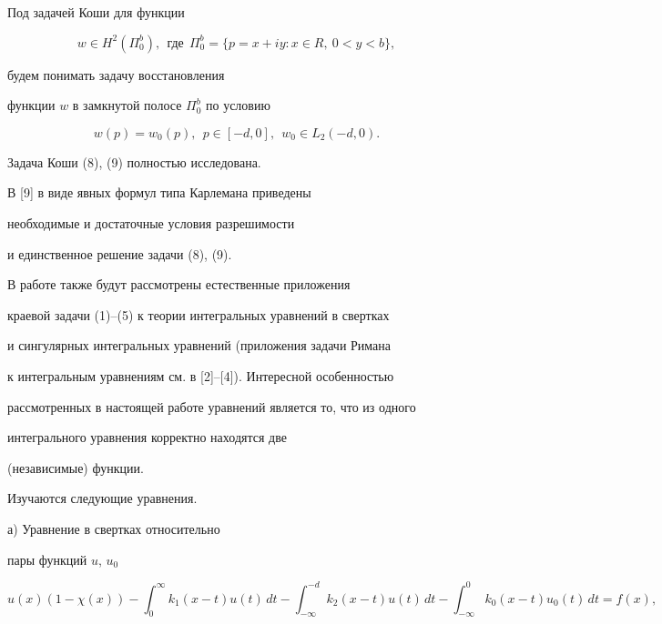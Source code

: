 Под задачей Коши для функции


\begin{equation}


w\in H^2(\Pi^b_0),\ \ \text{где}


\ \ \Pi^b_0=\{ p=x+iy : x\in R, \ 0<y<b\},


\end{equation}


будем понимать задачу восстановления


функции $w$ в замкнутой полосе $\Pi^b_0$ по условию


\begin{equation}


w(p)=w_0(p),\ \ p\in [-d,0],\ \ w_0\in L_2(-d,0).


\end{equation}


Задача Коши (8), (9) полностью исследована.


В [9] в виде явных формул типа Карлемана приведены


необходимые и достаточные условия разрешимости


и единственное решение задачи (8), (9).





В работе также будут рассмотрены естественные приложения


краевой задачи (1)--(5) к теории интегральных уравнений в свертках


и сингулярных интегральных уравнений (приложения задачи Римана


к интегральным уравнениям см. в [2]--[4]). Интересной особенностью


рассмотренных в настоящей работе уравнений является то, что из одного


интегрального уравнения корректно находятся две


(независимые) функции.





Изучаются следующие уравнения.





а) Уравнение в свертках относительно


пары функций $u$, $u_0$ 


\begin{equation}


u(x)(1-\chi(x))-\int_{0}^\infty k_1(x-t)u(t)\,dt-


\int_{-\infty}^{-d} k_2(x-t)u(t)\,dt -


\int_{-\infty}^{0} k_0(x-t)u_0(t)\,dt


=f(x), 


\end{equation}


